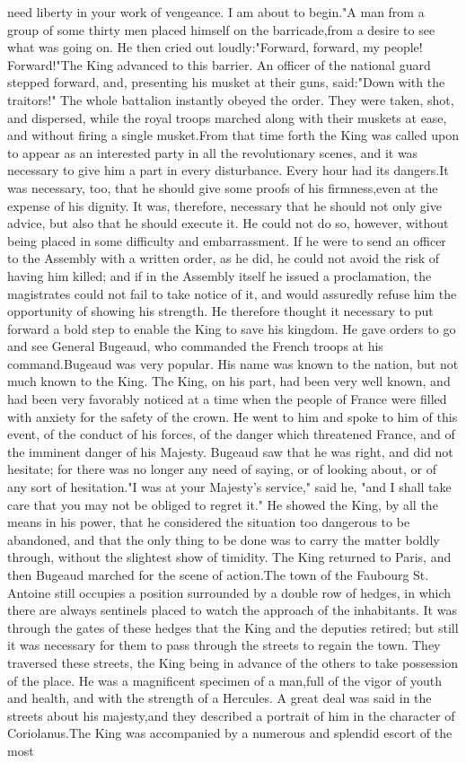 \documentclass[a4paper]{article}
\begin{document}
need liberty in your work of vengeance. I am about to begin."A man from a group of some thirty men placed himself on the barricade,from a desire to see what was going on. He then cried out loudly:"Forward, forward, my people! Forward!"The King advanced to this barrier. An officer of the national guard stepped forward, and, presenting his musket at their guns, said:"Down with the traitors!" The whole battalion instantly obeyed the order. They were taken, shot, and dispersed, while the royal troops marched along with their muskets at ease, and without firing a single musket.From that time forth the King was called upon to appear as an interested party in all the revolutionary scenes, and it was necessary to give him a part in every disturbance. Every hour had its dangers.It was necessary, too, that he should give some proofs of his firmness,even at the expense of his dignity. It was, therefore, necessary that he should not only give advice, but also that he should execute it. He could not do so, however, without being placed in some difficulty and embarrassment. If he were to send an officer to the Assembly with a written order, as he did, he could not avoid the risk of having him killed; and if in the Assembly itself he issued a proclamation, the magistrates could not fail to take notice of it, and would assuredly refuse him the opportunity of showing his strength. He therefore thought it necessary to put forward a bold step to enable the King to save his kingdom. He gave orders to go and see General Bugeaud, who commanded the French troops at his command.Bugeaud was very popular. His name was known to the nation, but not much known to the King. The King, on his part, had been very well known, and had been very favorably noticed at a time when the people of France were filled with anxiety for the safety of the crown. He went to him and spoke to him of this event, of the conduct of his forces, of the danger which threatened France, and of the imminent danger of his Majesty. Bugeaud saw that he was right, and did not hesitate; for there was no longer any need of saying, or of looking about, or of any sort of hesitation."I was at your Majesty's service," said he, "and I shall take care that you may not be obliged to regret it." He showed the King, by all the means in his power, that he considered the situation too dangerous to be abandoned, and that the only thing to be done was to carry the matter boldly through, without the slightest show of timidity. The King returned to Paris, and then Bugeaud marched for the scene of action.The town of the Faubourg St. Antoine still occupies a position surrounded by a double row of hedges, in which there are always sentinels placed to watch the approach of the inhabitants. It was through the gates of these hedges that the King and the deputies retired; but still it was necessary for them to pass through the streets to regain the town. They traversed these streets, the King being in advance of the others to take possession of the place. He was a magnificent specimen of a man,full of the vigor of youth and health, and with the strength of a Hercules. A great deal was said in the streets about his majesty,and they described a portrait of him in the character of Coriolanus.The King was accompanied by a numerous and splendid escort of the most 
\end{document}
